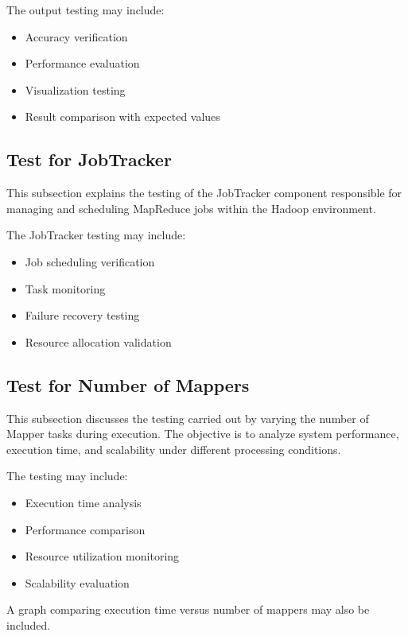 The output testing may include:
\begin{itemize}
    \item Accuracy verification
    \item Performance evaluation
    \item Visualization testing
    \item Result comparison with expected values
\end{itemize}


\subsection{Test for JobTracker}

This subsection explains the testing of the JobTracker component responsible for managing and scheduling MapReduce jobs within the Hadoop environment.

The JobTracker testing may include:
\begin{itemize}
    \item Job scheduling verification
    \item Task monitoring
    \item Failure recovery testing
    \item Resource allocation validation
\end{itemize}


\subsection{Test for Number of Mappers}

This subsection discusses the testing carried out by varying the number of Mapper tasks during execution. The objective is to analyze system performance, execution time, and scalability under different processing conditions.

The testing may include:
\begin{itemize}
    \item Execution time analysis
    \item Performance comparison
    \item Resource utilization monitoring
    \item Scalability evaluation
\end{itemize}

A graph comparing execution time versus number of mappers may also be included.

